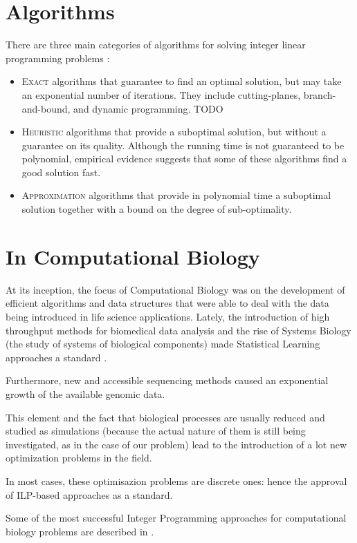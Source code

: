 \section{Algorithms}
There are three main categories of algorithms for solving integer linear programming problems \cite{ilpalg}:
\begin{itemize}
	\item \textsc{Exact} algorithms that guarantee to find an optimal solution, but may take an exponential number of iterations. They include cutting-planes, branch-and-bound, and dynamic programming. TODO
	\item \textsc{Heuristic} algorithms that provide a suboptimal solution, but without a guarantee on its quality. Although the running time is not guaranteed to be polynomial, empirical evidence suggests that some of these algorithms find a good solution fast.
	\item \textsc{Approximation} algorithms that provide in polynomial time a suboptimal solution together with a bound on the degree of sub-optimality.
\end{itemize}

\section{In Computational Biology}

At its inception, the focus of Computational Biology was on the development of efficient algorithms and data structures that were able to deal with the data being introduced in life science applications. Lately, the introduction of high throughput methods for biomedical data analysis and the rise of Systems Biology (the study of systems of biological components) made Statistical Learning approaches a standard \cite{ilpinb}.

Furthermore, new and accessible sequencing methods caused an exponential growth of the available genomic data.

This element and the fact that biological processes are usually reduced and studied as simulations (because the actual nature of them is still being investigated, as in the case of our problem) lead to the introduction of a lot new optimization problems in the field.

In most cases, these optimisazion problems are discrete ones: hence the approval of ILP-based approaches as a standard.

Some of the most successful Integer Programming approaches for computational biology problems are described in \cite{lancia2004}.

